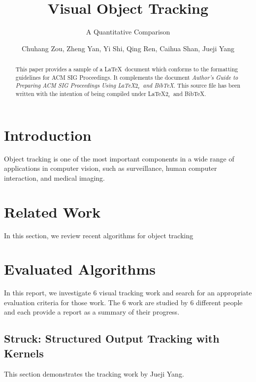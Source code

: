\documentclass{acm_proc_article-sp}
\begin{document}
\title{Visual Object Tracking}
\subtitle{A Quantitative Comparison}
\author{Chuhang Zou, Zheng Yan, Yi Shi, Qing Ren, Caihua Shan, Jueji Yang}
\maketitle

\begin{abstract}
This paper provides a sample of a \LaTeX\ document which conforms to
the formatting guidelines for ACM SIG Proceedings.
It complements the document \textit{Author's Guide to Preparing
ACM SIG Proceedings Using \LaTeX$2_\epsilon$\ and Bib\TeX}. This
source file has been written with the intention of being
compiled under \LaTeX$2_\epsilon$\ and BibTeX.
\end{abstract}


\section{Introduction}

Object tracking is one of the most important components in a wide range of applications in computer vision, such as surveillance, human computer interaction, and medical imaging.


\section{Related Work}

In this section, we review recent algorithms for object tracking


\section{Evaluated Algorithms}

In this report, we investigate 6 visual tracking work and search for an appropriate evaluation criteria for those work. The 6 work are studied by 6 different people and each provide a report as a summary of their progress.


\subsection{Struck: Structured Output Tracking with Kernels}
This section demonstrates the tracking work by Jueji Yang.
\end{document}
